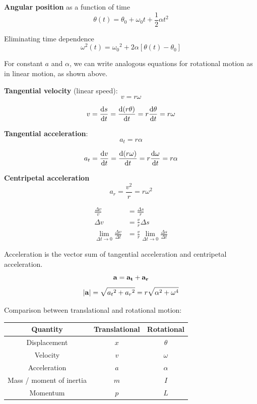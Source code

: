 \textbf{Angular position} as a function of time
\begin{equation}
\theta(t) = \theta_0 + \omega_0 t + \frac{1}{2}\alpha t^2
\end{equation}

Eliminating time dependence
\begin{equation}
\omega^2(t) = {\omega_0}^2 + 2 \alpha [\theta (t) - \theta_0]
\end{equation}

For constant $a$ and $\alpha$, we can write analogous equations for rotational motion as in linear motion, as shown above.

\textbf{Tangential velocity} (linear speed):
\begin{equation}
v = r\omega
\end{equation}

\begin{derivation}
\[ v = \odv{s}{t} = \odv{(r\theta)}{t} = r\odv{\theta}{t} = r\omega \]
\end{derivation}

\textbf{Tangential acceleration}:
\begin{equation}
a_t = r \alpha
\end{equation}
\begin{derivation}
\[ a_t = \odv{v}{t} = \odv{(r\omega)}{t} = r\odv{\omega}{t} = r\alpha \] 
\end{derivation}

\textbf{Centripetal acceleration}
\begin{equation}
a_r = \frac{v^2}{r} = r\omega^2
\end{equation}
\begin{derivation}
\begin{align*}
\frac{\Delta v}{v} &= \frac{\Delta s}{r} \\
\Delta v &= \frac{v}{r} \Delta s \\
\lim_{\Delta t \to 0} \frac{\Delta v}{\Delta t} &= \frac{v}{r} \lim_{\Delta t \to 0} \frac{\Delta s}{\Delta t}
\end{align*}
\end{derivation}

Acceleration is the vector sum of tangential acceleration and centripetal acceleration.
\[ \vb{a} = \vb{a_t} + \vb{a_r} \]
\begin{equation}
|\vb{a}| = \sqrt{{a_t}^2 + {a_r}^2} = r \sqrt{\alpha^2 + \omega^4}
\end{equation}

Comparison between translational and rotational motion:
\begin{table}[H]
\centering
\begin{tabular}{|c|c|c|}
\hline
Quantity & Translational & Rotational \\
\hline
Displacement & $x$ & $\theta$ \\
Velocity & $v$ & $\omega$ \\
Acceleration & $a$ & $\alpha$ \\
Mass / moment of inertia & $m$ & $I$ \\
Momentum & $p$ & $L$ \\
\hline
\end{tabular}
\end{table}
\pagebreak

